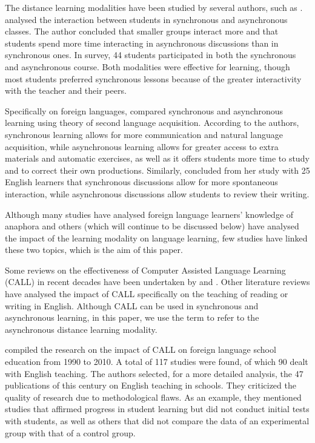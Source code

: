 \documentclass{textolivre}
\begin{document}
The distance learning modalities have been studied by several authors,
such as \textcite{chou_comparative_2002,skylar_comparison_2009}. \textcite{chou_comparative_2002} analysed the
interaction between students in synchronous and asynchronous classes.
The author concluded that smaller groups interact more and that students
spend more time interacting in asynchronous discussions than in
synchronous ones. In  survey, 44 students participated in
both the synchronous and asynchronous course. Both modalities were
effective for learning, though most students preferred synchronous
lessons because of the greater interactivity with the teacher and their
peers.

Specifically on foreign languages, \textcite{chen_adoption_2007} compared
synchronous and asynchronous learning using  theory of
second language acquisition. According to the authors, synchronous
learning allows for more communication and natural language acquisition,
while asynchronous learning allows for greater access to extra materials
and automatic exercises, as well as it offers students more time to
study and to correct their own productions. Similarly, 
concluded from her study with 25 English learners that synchronous
discussions allow for more spontaneous interaction, while asynchronous
discussions allow students to review their writing.

Although many studies have analysed foreign language learners' knowledge
of anaphora and others (which will continue to be discussed below) have
analysed the impact of the learning modality on language learning, few
studies have linked these two topics, which is the aim of this paper.

Some reviews on the effectiveness of Computer Assisted Language Learning
(CALL) in recent decades have been undertaken by \textcite{stockwell_review_2007}  %
and \textcite{liu_look_2002}. Other literature reviews have
analysed the impact of CALL specifically on the teaching of reading
\cite{kim_use_2002} or writing \cite{yang_review_2012} in English. Although
CALL can be used in synchronous and asynchronous learning, in this
paper, we use the term to refer to the asynchronous distance learning
modality.

\textcite{macaro_systematic_2012} compiled the research on the impact
of CALL on foreign language school education from 1990 to 2010. A total
of 117 studies were found, of which 90 dealt with English teaching. The
authors selected, for a more detailed analysis, the 47 publications of
this century on English teaching in schools. They criticized the quality
of research due to methodological flaws. As an example, they mentioned
studies that affirmed progress in student learning but did not conduct
initial tests with students, as well as others that did not compare the
data of an experimental group with that of a control group.
\end{document}
